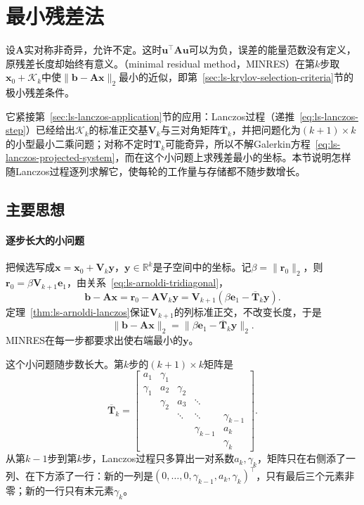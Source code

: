 \section{最小残差法}
\label{sec:ls-minres}

设$\bm A$实对称非奇异，允许不定。这时$\bm u^\top\bm A\bm u$可以为负，误差的能量范数没有定义，原残差长度却始终有意义。（minimal residual method，MINRES）在第$k$步取$\bm x_0+\mathcal K_k$中使$\lVert\bm b-\bm A\bm x\rVert_2$最小的近似，即第~\ref{sec:ls-krylov-selection-criteria}节的极小残差条件。

它紧接第~\ref{sec:ls-lanczos-application}节的应用：Lanczos过程（递推~\eqref{eq:ls-lanczos-step}）已经给出$\mathcal K_k$的标准正交基$\bm V_k$与三对角矩阵$\overline{\bm T}_k$，并把问题化为$(k+1)\times k$的小型最小二乘问题；对称不定时$\bm T_k$可能奇异，所以不解Galerkin方程~\eqref{eq:ls-lanczos-projected-system}，而在这个小问题上求残差最小的坐标。本节说明怎样随Lanczos过程逐列求解它，使每轮的工作量与存储都不随步数增长。

\subsection{主要思想}

\paragraph{逐步长大的小问题}
把候选写成$\bm x=\bm x_0+\bm V_k\bm y$，$\bm y\in\mathbb R^k$是子空间中的坐标。记$\beta=\lVert\bm r_0\rVert_2$，则$\bm r_0=\beta\bm V_{k+1}\bm e_1$，由关系~\eqref{eq:ls-arnoldi-tridiagonal}，
\[
 \bm b-\bm A\bm x=\bm r_0-\bm A\bm V_k\bm y=\bm V_{k+1}(\beta\bm e_1-\overline{\bm T}_k\bm y).
\]
定理~\ref{thm:ls-arnoldi-lanczos}保证$\bm V_{k+1}$的列标准正交，不改变长度，于是
\begin{equation}
 \lVert\bm b-\bm A\bm x\rVert_2=\lVert\beta\bm e_1-\overline{\bm T}_k\bm y\rVert_2 .
 \label{eq:ls-minres-small-problem}
\end{equation}
MINRES在每一步都要求出使右端最小的$\bm y$。

这个小问题随步数长大。第$k$步的$(k+1)\times k$矩阵是
\[
 \overline{\bm T}_k=
 \begin{bmatrix}
 a_1&\gamma_1&&&\\
 \gamma_1&a_2&\gamma_2&&\\
 &\gamma_2&a_3&\ddots&\\
 &&\ddots&\ddots&\gamma_{k-1}\\
 &&&\gamma_{k-1}&a_k\\
 &&&&\gamma_k
 \end{bmatrix}.
\]
从第$k-1$步到第$k$步，Lanczos过程只多算出一对系数$a_k,\gamma_k$，矩阵只在右侧添了一列、在下方添了一行：新的一列是$(0,\ldots,0,\gamma_{k-1},a_k,\gamma_k)^\top$，只有最后三个元素非零；新的一行只有末元素$\gamma_k$。

